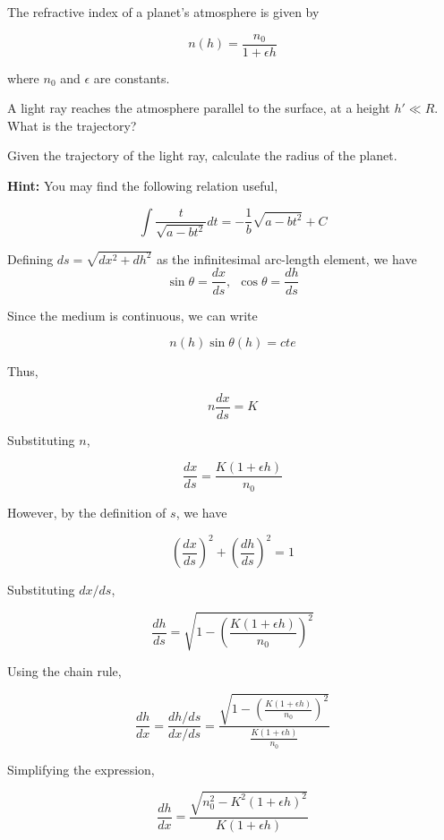 \documentclass[11pt]{article}
\begin{document}
\begin{pproblem}
    The refractive index of a planet's atmosphere is given by

    \[n(h) = \frac{n_0}{1+\epsilon h}\]

    where \(n_0\) and \(\epsilon\) are constants.

    \begin{alternativas}
        \item A light ray reaches the atmosphere parallel to the surface, at a height \(h'\ll R\). What is the trajectory?
        \item Given the trajectory of the light ray, calculate the radius of the planet.
    
        \textbf{Hint:} You may find the following relation useful,

        \[\int \frac{t}{\sqrt{a-bt^2}}dt = -\frac{1}{b}\sqrt{a-bt^2}+C\]
    \end{alternativas}
\begin{pssolution*}{}{}
    \begin{alternativas}
        \item Defining \(ds = \sqrt{dx^2+dh^2}\) as the infinitesimal arc-length element, we have
        \[\sin\theta = \frac{dx}{ds}, \ \ \cos\theta = \frac{dh}{ds}\]

        Since the medium is continuous, we can write

        \[n(h)\sin\theta(h)=cte\]

        Thus,

        \[n\frac{dx}{ds} = K\]

        Substituting \(n\),

        \[\frac{dx}{ds} = \frac{K(1+\epsilon h)}{n_0}\]

        However, by the definition of \(s\), we have

        \[\left(\frac{dx}{ds}\right)^2 + \left(\frac{dh}{ds}\right)^2 = 1\]

        Substituting \(dx/ds\),

        \[\frac{dh}{ds} = \sqrt{1- \left(\frac{K(1+\epsilon h)}{n_0}\right)^2}\]

        Using the chain rule,

        \[\frac{dh}{dx} = \frac{dh/ds}{dx/ds} = \frac{\sqrt{1- \left(\frac{K(1+\epsilon h)}{n_0}\right)^2}}{\frac{K(1+\epsilon h)}{n_0}}\]

        Simplifying the expression,

        \[\frac{dh}{dx} = \frac{\sqrt{n_0^2 - K^2(1+\epsilon h)^2}}{K(1+\epsilon h)}\]


\end{alternativas}
\end{pssolution*}
\end{pproblem}
\end{document}
